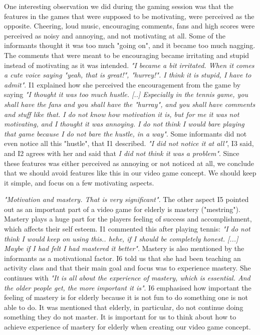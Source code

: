 One interesting observation we did during the gaming session was that the features in the games that were supposed to be motivating, were perceived as the opposite. Cheering, loud music, encouraging comments, fans and high scores were perceived as noisy and annoying, and not motivating at all. Some of the informants thought it was too much "going on", and it became too much nagging. The comments that were meant to be encouraging became irritating and stupid instead of motivating as it was intended. \emph{"I became a bit irritated. When it comes a cute voice saying "yeah, that is great!", "hurrey!". I think it is stupid, I have to admit"}.  I1 explained how she perceived the encouragement from the game by saying \emph{"I thought it was too much hustle. [..] Especially in the tennis game, you shall have the fans and you shall have the "hurray", and you shall have comments and stuff like that. I do not know how motivation it is, but for me it was not motivating, and I thought it was annoying. I do not think I would bare playing that game because I do not bare the hustle, in a way"}. Some informants did not even notice all this "hustle", that I1 described. \emph{"I did not notice it at all"}, I3 said, and I2 agrees with her and said that \emph{I did not think it was a problem"}. Since these features was either perceived as annoying or not noticed at all, we conclude that we should avoid features like this in our video game concept. We should keep it simple, and focus on a few motivating aspects. 

\emph{"Motivation and mastery. That is very significant"}. The other aspect I5 pointed out as an important part of a video game for elderly is mastery ("mestring"). Mastery plays a huge part for the players feeling of success and accomplishment, which affects their self esteem. I1 commented this after playing tennis: \emph{"I do not think I would keep on using this.. hehe, if I should be completely honest. [...] Maybe if I had felt I had mastered it better"}. Mastery is also mentioned by the informants as a motivational factor. I6 told us that she had been teaching an activity class and that their main goal and focus was to experience mastery. She continues with \emph{"It is all about the experience of mastery, which is essential. And the older people get, the more important it is"}. I6 emphasised how important the feeling of mastery is for elderly because it is not fun to do something one is not able to do. It was mentioned that elderly, in particular, do not continue doing something they do not master. It is important for us to think about how to achieve experience of mastery for elderly when creating our video game concept. 

